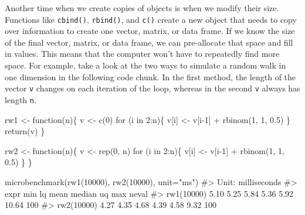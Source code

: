 \documentclass[
  letterpaper,
]{latex/krantz}
\makeatletter
\newenvironment{Shaded}{\begin{snugshade}}{\end{snugshade}}
\newcommand{\AttributeTok}[1]{\textcolor[rgb]{0.40,0.45,0.13}{#1}}
\newcommand{\CommentTok}[1]{\textcolor[rgb]{0.37,0.37,0.37}{#1}}
\newcommand{\ControlFlowTok}[1]{\textcolor[rgb]{0.00,0.23,0.31}{#1}}
\newcommand{\DecValTok}[1]{\textcolor[rgb]{0.68,0.00,0.00}{#1}}
\newcommand{\FloatTok}[1]{\textcolor[rgb]{0.68,0.00,0.00}{#1}}
\newcommand{\FunctionTok}[1]{\textcolor[rgb]{0.28,0.35,0.67}{#1}}
\newcommand{\NormalTok}[1]{\textcolor[rgb]{0.00,0.23,0.31}{#1}}
\newcommand{\OtherTok}[1]{\textcolor[rgb]{0.00,0.23,0.31}{#1}}
\newcommand{\SpecialCharTok}[1]{\textcolor[rgb]{0.37,0.37,0.37}{#1}}
\newcommand{\StringTok}[1]{\textcolor[rgb]{0.13,0.47,0.30}{#1}}
\newenvironment{kframe}{%
\medskip{}
\setlength{\fboxsep}{.8em}
 \def\at@end@of@kframe{}%
 \ifinner\ifhmode%
  \def\at@end@of@kframe{\end{minipage}}%
  \begin{minipage}{\columnwidth}%
 \fi\fi%
 \def\FrameCommand##1{\hskip\@totalleftmargin \hskip-\fboxsep
 \colorbox{shadecolor}{##1}\hskip-\fboxsep
     \hskip-\linewidth \hskip-\@totalleftmargin \hskip\columnwidth}%
 \MakeFramed {\advance\hsize-\width
   \@totalleftmargin\z@ \linewidth\hsize
   \@setminipage}}%
 {\par\unskip\endMakeFramed%
 \at@end@of@kframe}
\renewenvironment{Shaded}{\begin{kframe}}{\end{kframe}}
\makeatother
\begin{document}
Another time when we create copies of objects is when we modify their
size. Functions like \texttt{cbind()}, \texttt{rbind()}, and
\texttt{c()} create a new object that needs to copy over information to
create one vector, matrix, or data frame. If we know the size of the
final vector, matrix, or data frame, we can pre-allocate that space and
fill in values. This means that the computer won't have to repeatedly
find more space. For example, take a look at the two ways to simulate a
random walk in one dimension in the following code chunk. In the first
method, the length of the vector \texttt{v} changes on each iteration of
the loop, whereas in the second \texttt{v} always has length \texttt{n}.

\begin{Shaded}
\begin{Highlighting}[]
\NormalTok{rw1 }\OtherTok{\textless{}{-}} \ControlFlowTok{function}\NormalTok{(n)\{}
\NormalTok{  v }\OtherTok{\textless{}{-}} \FunctionTok{c}\NormalTok{(}\DecValTok{0}\NormalTok{)}
  \ControlFlowTok{for}\NormalTok{ (i }\ControlFlowTok{in} \DecValTok{2}\SpecialCharTok{:}\NormalTok{n)\{}
\NormalTok{    v[i] }\OtherTok{\textless{}{-}}\NormalTok{ v[i}\DecValTok{{-}1}\NormalTok{] }\SpecialCharTok{+} \FunctionTok{rbinom}\NormalTok{(}\DecValTok{1}\NormalTok{, }\DecValTok{1}\NormalTok{, }\FloatTok{0.5}\NormalTok{)}
\NormalTok{  \}}
  \FunctionTok{return}\NormalTok{(v)}
\NormalTok{\}}

\NormalTok{rw2 }\OtherTok{\textless{}{-}} \ControlFlowTok{function}\NormalTok{(n)\{}
\NormalTok{  v }\OtherTok{\textless{}{-}} \FunctionTok{rep}\NormalTok{(}\DecValTok{0}\NormalTok{, n)}
  \ControlFlowTok{for}\NormalTok{ (i }\ControlFlowTok{in} \DecValTok{2}\SpecialCharTok{:}\NormalTok{n)\{}
\NormalTok{    v[i] }\OtherTok{\textless{}{-}}\NormalTok{ v[i}\DecValTok{{-}1}\NormalTok{] }\SpecialCharTok{+} \FunctionTok{rbinom}\NormalTok{(}\DecValTok{1}\NormalTok{, }\DecValTok{1}\NormalTok{, }\FloatTok{0.5}\NormalTok{)}
\NormalTok{  \}}
\NormalTok{\}}

\FunctionTok{microbenchmark}\NormalTok{(}\FunctionTok{rw1}\NormalTok{(}\DecValTok{10000}\NormalTok{), }\FunctionTok{rw2}\NormalTok{(}\DecValTok{10000}\NormalTok{), }\AttributeTok{unit=}\StringTok{"ms"}\NormalTok{)}
\CommentTok{\#\textgreater{} Unit: milliseconds}
\CommentTok{\#\textgreater{}        expr  min   lq mean median   uq   max neval}
\CommentTok{\#\textgreater{}  rw1(10000) 5.10 5.25 5.84   5.36 5.92 10.64   100}
\CommentTok{\#\textgreater{}  rw2(10000) 4.27 4.35 4.68   4.39 4.58  9.32   100}
\end{Highlighting}
\end{Shaded}
\end{document}
